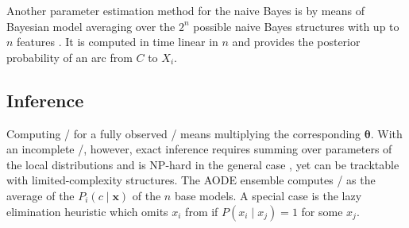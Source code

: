 Another parameter estimation method for the naive Bayes is by means of
Bayesian model averaging over the \(2^n\) possible naive Bayes
structures with up to \(n\) features \citep{Dash2002}. It is computed in
time linear in \(n\) and provides the posterior probability of an arc
from \(C\) to \(X_i\).

\subsection{Inference}\label{inference}

Computing \pcgx/ for a fully observed \x/ means multiplying the
corresponding \(\boldsymbol{\theta}\). With an incomplete \x/, however,
exact inference requires summing over parameters of the local
distributions and is NP-hard in the general case \citep{cooper1990}, yet
can be tracktable with limited-complexity structures. The AODE ensemble
computes \pcgx/ as the average of the \(P_i (c\mid\mathbf{x})\) of the
\(n\) base models. A special case is the lazy elimination
\citep{zheng2006efficient} heuristic which omits \(x_i\) from
 if \(P(x_i \mid x_j) = 1\) for some \(x_j\).

